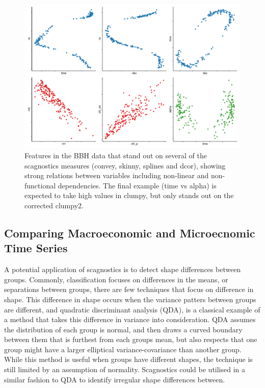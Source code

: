 \begin{Schunk}
\begin{figure}
\includegraphics[width=1\linewidth]{mason-lee-laa-cook_files/figure-latex/blackholes-1} \caption[Features in the BBH data that stand out on several of the scagnostics measures (convey, skinny, splines and dcor), showing strong relations between variables including non-linear and non-functional dependencies]{Features in the BBH data that stand out on several of the scagnostics measures (convey, skinny, splines and dcor), showing strong relations between variables including non-linear and non-functional dependencies. The final example (time vs alpha) is expected to take high values in clumpy, but only stands out on the corrected clumpy2.}\label{fig:blackholes}
\end{figure}
\end{Schunk}

\hypertarget{comparing-macroeconomic-and-microecnomic-time-series}{%
\subsection{Comparing Macroeconomic and Microecnomic Time
Series}\label{comparing-macroeconomic-and-microecnomic-time-series}}

A potential application of scagnostics is to detect shape differences
between groups. Commonly, classification focuses on differences in the
means, or separations between groups, there are few techniques that
focus on difference in shape. This difference in shape occurs when the
variance patters between groups are different, and quadratic
discriminant analysis (QDA), is a classical example of a method that
takes this difference in variance into consideration. QDA assumes the
distribution of each group is normal, and then draws a curved boundary
between them that is furthest from each groups mean, but also respects
that one group might have a larger elliptical variance-covariance than
another group. While this method is useful when groups have different
shapes, the technique is still limited by an assumption of normality.
Scagnostics could be utilised in a similar fashion to QDA to identify
irregular shape differences between.

